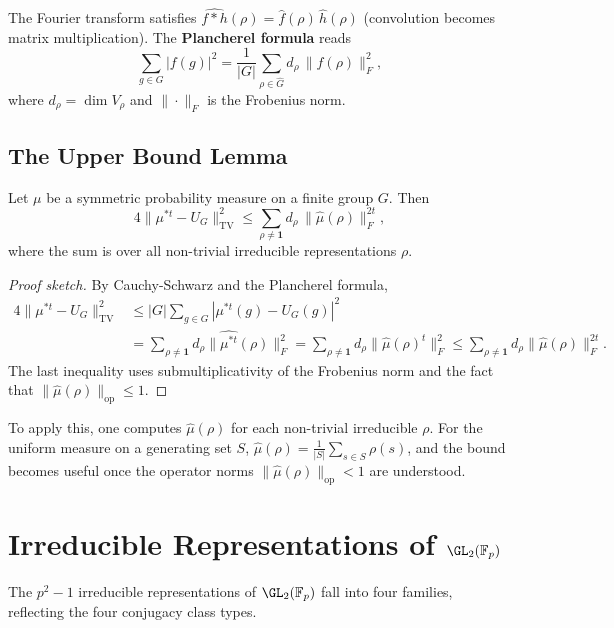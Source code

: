 The Fourier transform satisfies $\widehat{f * h}(\rho) = \hat{f}(\rho)\,\hat{h}(\rho)$
(convolution becomes matrix multiplication).
The \textbf{Plancherel formula} reads
\[
  \sum_{g \in G} |f(g)|^2 = \frac{1}{|G|} \sum_{\rho \in \hat{G}} d_\rho\,\|\hat{f}(\rho)\|_F^2,
\]
where $d_\rho = \dim V_\rho$ and $\|\cdot\|_F$ is the Frobenius norm.

\subsection{The Upper Bound Lemma}

\begin{theorem}
Let $\mu$ be a symmetric probability measure on a finite group $G$.
Then
\[
  4\|\mu^{*t} - U_G\|_{\mathrm{TV}}^2
  \leq \sum_{\rho \neq \mathbf{1}} d_\rho\,\|\hat\mu(\rho)\|_F^{2t},
\]
where the sum is over all non-trivial irreducible representations $\rho$.
\end{theorem}

\begin{proof}[Proof sketch]
By Cauchy-Schwarz and the Plancherel formula,
\begin{align*}
  4\|\mu^{*t} - U_G\|_{\mathrm{TV}}^2
  &\leq |G| \sum_{g \in G}|\mu^{*t}(g) - U_G(g)|^2 \\
  &= \sum_{\rho \neq \mathbf{1}} d_\rho \|\widehat{\mu^{*t}}(\rho)\|_F^2
  = \sum_{\rho \neq \mathbf{1}} d_\rho \|\hat\mu(\rho)^t\|_F^2
  \leq \sum_{\rho \neq \mathbf{1}} d_\rho \|\hat\mu(\rho)\|_F^{2t}.
\end{align*}
The last inequality uses submultiplicativity of the Frobenius norm and the
fact that $\|\hat\mu(\rho)\|_{\mathrm{op}} \leq 1$.
\end{proof}

To apply this, one computes $\hat\mu(\rho)$ for each non-trivial irreducible $\rho$.
For the uniform measure on a generating set $S$,
$\hat\mu(\rho) = \frac{1}{|S|}\sum_{s \in S} \rho(s)$,
and the bound becomes useful once the operator norms $\|\hat\mu(\rho)\|_{\mathrm{op}} < 1$
are understood.

\section{Irreducible Representations of \texorpdfstring{$\GL_2(\mathbb{F}_p)$}{GL2(Fp)}}

The $p^2 - 1$ irreducible representations of $\GL_2(\mathbb{F}_p)$ fall into
four families, reflecting the four conjugacy class types.

